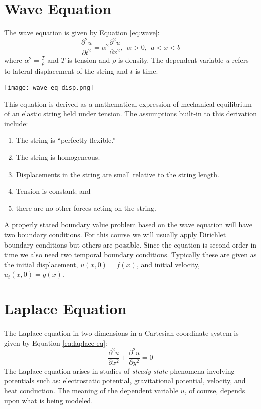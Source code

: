 \section{Wave Equation}

The wave equation is given by Equation \ref{eq:wave}:
\begin{equation}
\frac{\partial^2 u}{\partial t^2} = \alpha^2 \frac{\partial^2 u}{\partial x^2}, \ \ \alpha>0, \ \ a<x<b
\label{eq:wave}
\end{equation}
where $\alpha^2 = \frac{T}{\rho}$ and $T$ is tension and $\rho$ is density.  The dependent variable $u$ refers to lateral displacement of the string and $t$ is time.
\begin{marginfigure}
\texttt{[image: wave\_eq\_disp.png]}
\end{marginfigure}

This equation is derived as a mathematical expression of mechanical equilibrium of an elastic string held under tension.  The assumptions built-in to this derivation include:
\begin{enumerate}
\item The string is ``perfectly flexible.'' 
\item The string is homogeneous.
\item Displacements in the string are small relative to the string length.
\item Tension is constant; and
\item there are no other forces acting on the string.
\end{enumerate}
A properly stated boundary value problem based on the wave equation will have two boundary conditions.  For this course we will usually apply Dirichlet boundary conditions but others are possible.  Since the equation is second-order in time we also need two temporal boundary conditions.  Typically these are given as the initial displacement, $u(x,0)=f(x)$, and initial velocity, $u_t(x,0)=g(x)$.

\section{Laplace Equation}
The Laplace equation in two dimensions in a Cartesian coordinate system is given by Equation \ref{eq:laplace-eq}:
\begin{equation}
\frac{\partial^2 u}{\partial x^2} + \frac{\partial^2 u}{\partial y^2} = 0
\label{eq:laplace-eq}
\end{equation}
The Laplace equation arises in studies of \emph{steady state} phenomena involving potentials such as: electrostatic potential, gravitational potential, velocity, and heat conduction.  The meaning of the dependent variable $u$, of course, depends upon what is being modeled.  


